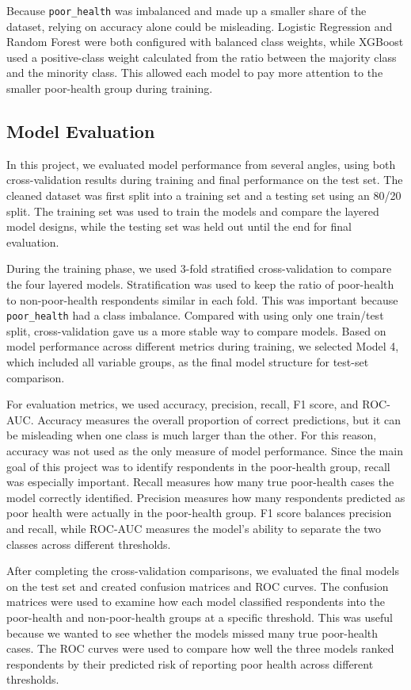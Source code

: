 Because \texttt{poor\_health} was imbalanced and made up a smaller share of the dataset, relying on accuracy alone could be misleading. Logistic Regression and Random Forest were both configured with balanced class weights, while XGBoost used a positive-class weight calculated from the ratio between the majority class and the minority class. This allowed each model to pay more attention to the smaller poor-health group during training.

\subsection{Model Evaluation}
In this project, we evaluated model performance from several angles, using both cross-validation results during training and final performance on the test set. The cleaned dataset was first split into a training set and a testing set using an 80/20 split. The training set was used to train the models and compare the layered model designs, while the testing set was held out until the end for final evaluation.

During the training phase, we used 3-fold stratified cross-validation to compare the four layered models. Stratification was used to keep the ratio of poor-health to non-poor-health respondents similar in each fold. This was important because \texttt{poor\_health} had a class imbalance. Compared with using only one train/test split, cross-validation gave us a more stable way to compare models. Based on model performance across different metrics during training, we selected Model 4, which included all variable groups, as the final model structure for test-set comparison.

For evaluation metrics, we used accuracy, precision, recall, F1 score, and ROC-AUC. Accuracy measures the overall proportion of correct predictions, but it can be misleading when one class is much larger than the other. For this reason, accuracy was not used as the only measure of model performance. Since the main goal of this project was to identify respondents in the poor-health group, recall was especially important. Recall measures how many true poor-health cases the model correctly identified. Precision measures how many respondents predicted as poor health were actually in the poor-health group. F1 score balances precision and recall, while ROC-AUC measures the model's ability to separate the two classes across different thresholds.

After completing the cross-validation comparisons, we evaluated the final models on the test set and created confusion matrices and ROC curves. The confusion matrices were used to examine how each model classified respondents into the poor-health and non-poor-health groups at a specific threshold. This was useful because we wanted to see whether the models missed many true poor-health cases. The ROC curves were used to compare how well the three models ranked respondents by their predicted risk of reporting poor health across different thresholds.


